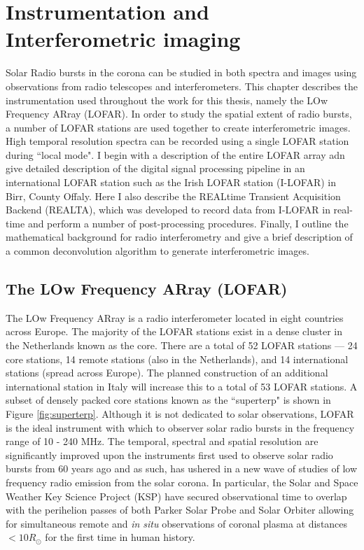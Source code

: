 \doublespacing
\chapter{Instrumentation and Interferometric imaging}
\label{chap:instrumentation}
Solar Radio bursts in the corona can be studied in both spectra and images using observations from radio telescopes and interferometers. This chapter describes the instrumentation used throughout the work for this thesis, namely the LOw Frequency ARray (LOFAR). In order to study the spatial extent of radio bursts, a number of LOFAR stations are used together to create interferometric images.  High temporal resolution spectra can be recorded using a single LOFAR station during ``local mode". I begin with a description of the entire LOFAR array adn give detailed description of the digital signal processing pipeline in an international LOFAR station such as the Irish LOFAR station (I-LOFAR) in Birr, County Offaly. Here I also describe the REALtime Transient Acquisition Backend (REALTA), which was developed to record data from I-LOFAR in real-time and perform a number of post-processing procedures. Finally, I outline the mathematical background for radio interferometry and give a brief description of a common deconvolution algorithm to generate interferometric images.

\section{The LOw Frequency ARray (LOFAR)}
The LOw Frequency ARray \citep[LOFAR;][]{VanHaarlem2013} is a radio interferometer located in eight countries across Europe. The majority of the LOFAR stations exist in a dense cluster in the Netherlands known as the core. There are a total of 52 LOFAR stations --- 24 core stations, 14 remote stations (also in the Netherlands), and 14 international stations (spread across Europe). The planned construction of an additional international station in Italy will increase this to a total of 53 LOFAR stations. A subset of densely packed core stations known as the ``superterp" is shown in Figure \ref{fig:superterp}. Although it is not dedicated to solar observations, LOFAR is the ideal instrument with which to observer solar radio bursts in the frequency range of 10 - 240 MHz. The temporal, spectral and spatial resolution are significantly improved upon the instruments first used to observe solar radio bursts from 60 years ago and as such, has ushered in a new wave of studies of low frequency radio emission from the solar corona. In particular, the Solar and Space Weather Key Science Project (KSP) have secured observational time to overlap with the perihelion passes of both Parker Solar Probe and Solar Orbiter allowing for simultaneous remote and \textit{in situ} observations of coronal plasma at distances $< 10 R_\odot$ for the first time in human history.

